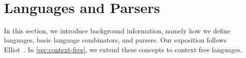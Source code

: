 \begin{code}[hide]
\AgdaSymbol{\}}\AgdaSpace{}%
\AgdaSymbol{\{}\AgdaSpace{}%
\AgdaSymbol{:}\AgdaSpace{}%
\AgdaSpace{}%
\AgdaSymbol{\}}\AgdaSpace{}%
\AgdaSymbol{\{}\AgdaSpace{}%
\AgdaSymbol{:}\AgdaSpace{}%
\AgdaSpace{}%
\AgdaSymbol{\}}\AgdaSpace{}%
\AgdaSpace{}%
\AgdaSymbol{(}\AgdaSpace{}%
\AgdaSpace{}%
\AgdaSpace{}%
\AgdaSpace{}%
\AgdaSymbol{)}\AgdaSpace{}%
\AgdaSpace{}%
\AgdaSpace{}%
\AgdaSpace{}%
\AgdaSpace{}%
\AgdaSpace{}%
\AgdaSpace{}%
\<%
\\
\>[0]\AgdaSpace{}%
\AgdaSpace{}%
\AgdaSpace{}%
\AgdaInductiveConstructor{[]}\AgdaSpace{}%
\AgdaSymbol{=}\AgdaSpace{}%
\<%
\\
\>[0]\AgdaSpace{}%
\AgdaSpace{}%
\AgdaSpace{}%
\AgdaSymbol{(}\AgdaSpace{}%
\AgdaSpace{}%
\AgdaSymbol{)}\AgdaSpace{}%
\AgdaSymbol{=}\AgdaSpace{}%
\AgdaSpace{}%
\AgdaSpace{}%
\AgdaSymbol{(}\AgdaSpace{}%
\AgdaSpace{}%
\AgdaSymbol{)}\AgdaSpace{}%
\<%
\\
%
\\[\AgdaEmptyExtraSkip]%
\>[0]\<%
\\
\>[0][@{}l@{\AgdaIndent{0}}]%
\>[4]\AgdaSpace{}%
\AgdaSpace{}%
\AgdaSymbol{:}\AgdaSpace{}%
\<%
\\
%
\>[4]\AgdaSpace{}%
\AgdaSymbol{:}\AgdaSpace{}%
\AgdaSpace{}%
\<%
\\
%
\>[4]\AgdaSpace{}%
\AgdaSpace{}%
\AgdaSymbol{:}\AgdaSpace{}%
\<%
\\
%
\>[4]\AgdaSpace{}%
\AgdaSymbol{:}\AgdaSpace{}%
\<%
\end{code}

\section{Languages and Parsers}

In this section, we introduce background information, namely how we define languages, basic language combinators, and parsers. Our exposition follows Elliot~\cite{conal-languages}. In \cref{sec:context-free}, we extend these concepts to context free languages.

